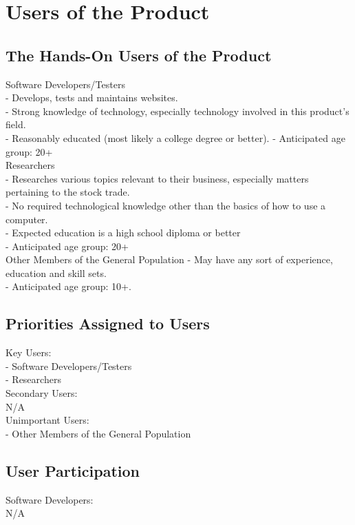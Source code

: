 \documentclass[titlepage]{article}
\begin{document}
\section{Users of the Product}

\subsection*{The Hands-On Users of the Product}
Software Developers/Testers\\
- Develops, tests and maintains websites.\\
- Strong knowledge of technology, especially technology involved in this product’s field.\\
- Reasonably educated (most likely a college degree or better).
- Anticipated age group: 20+\\

Researchers\\
- Researches various topics relevant to their business, especially matters pertaining to the stock trade.\\
- No required technological knowledge other than the basics of how to use a computer.\\
- Expected education is a high school diploma or better\\
- Anticipated age group: 20+\\

Other Members of the General Population
- May have any sort of experience, education and skill sets.\\
- Anticipated age group: 10+.\\


\subsection*{Priorities Assigned to Users}
Key Users:\\
- Software Developers/Testers\\
- Researchers\\

Secondary Users:\\
N/A\\

Unimportant Users:\\
- Other Members of the General Population\\

\subsection*{User Participation}
Software Developers:\\
N/A\\
\end{document}
